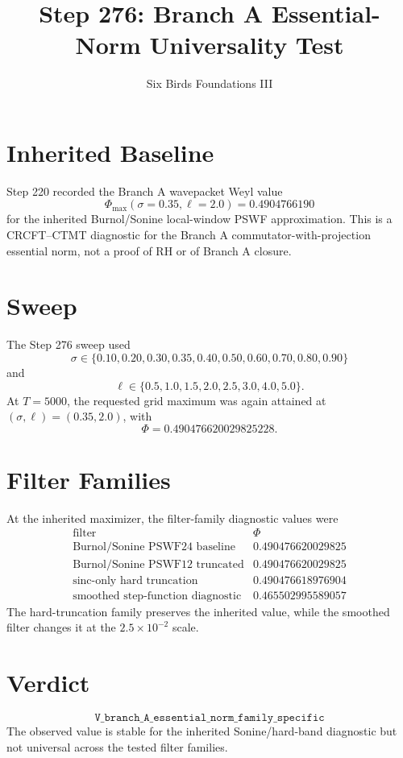 \documentclass[11pt]{article}
\title{Step 276: Branch A Essential-Norm Universality Test}
\author{Six Birds Foundations III}
\date{}
\begin{document}
\maketitle

\section*{Inherited Baseline}
Step 220 recorded the Branch A wavepacket Weyl value
\[
\Phi_{\max}(\sigma=0.35,\ell=2.0)=0.4904766190
\]
for the inherited Burnol/Sonine local-window PSWF approximation.  This is a
CRCFT--CTMT diagnostic for the Branch A commutator-with-projection essential
norm, not a proof of RH or of Branch A closure.

\section*{Sweep}
The Step 276 sweep used
\[
\sigma\in\{0.10,0.20,0.30,0.35,0.40,0.50,0.60,0.70,0.80,0.90\}
\]
and
\[
\ell\in\{0.5,1.0,1.5,2.0,2.5,3.0,4.0,5.0\}.
\]
At \(T=5000\), the requested grid maximum was again attained at
\((\sigma,\ell)=(0.35,2.0)\), with
\[
\Phi=0.490476620029825228.
\]

\section*{Filter Families}
At the inherited maximizer, the filter-family diagnostic values were
\[
\begin{array}{c|c}
\text{filter} & \Phi\\
\hline
\text{Burnol/Sonine PSWF24 baseline} & 0.490476620029825\\
\text{Burnol/Sonine PSWF12 truncated} & 0.490476620029825\\
\text{sinc-only hard truncation} & 0.490476618976904\\
\text{smoothed step-function diagnostic} & 0.465502995589057
\end{array}
\]
The hard-truncation family preserves the inherited value, while the smoothed
filter changes it at the \(2.5\times 10^{-2}\) scale.

\section*{Verdict}
\[
\boxed{\texttt{V\_branch\_A\_essential\_norm\_family\_specific}}
\]
The observed value is stable for the inherited Sonine/hard-band diagnostic but
not universal across the tested filter families.
\end{document}
